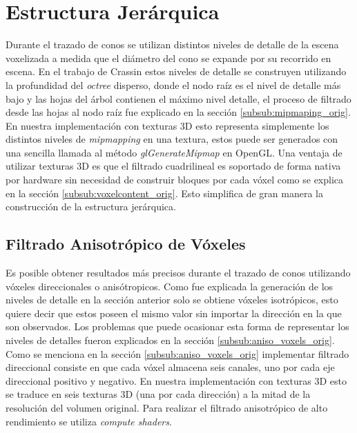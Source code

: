 \section{Estructura Jerárquica} %
\label{sec:estructura_jerarquica}
Durante el trazado de conos se utilizan distintos niveles de detalle de la escena voxelizada a medida que el diámetro del cono se expande por su recorrido en escena. En el trabajo de Crassin estos niveles de detalle se construyen utilizando la profundidad del \emph{octree} disperso, donde el nodo raíz es el nivel de detalle más bajo y las hojas del árbol contienen el máximo nivel detalle, el proceso de filtrado desde las hojas al nodo raíz fue explicado en la sección \ref{subsub:mipmaping_orig}. En nuestra implementación con texturas 3D esto representa simplemente los distintos niveles de \emph{mipmapping} en una textura, estos puede ser generados con una sencilla llamada al método \emph{glGenerateMipmap} en OpenGL. Una ventaja de utilizar texturas 3D es que el filtrado cuadrilineal es soportado de forma nativa por hardware sin necesidad de construir bloques por cada vóxel como se explica en la sección \ref{subsub:voxelcontent_orig}. Esto simplifica de gran manera la construcción de la estructura jerárquica.

\subsection{Filtrado Anisotrópico de Vóxeles} %
\label{sub:mipmapping_direccioanl}
Es posible obtener resultados más precisos durante el trazado de conos utilizando vóxeles direccionales o anisótropicos. Como fue explicada la generación de los niveles de detalle en la sección anterior solo se obtiene vóxeles isotrópicos, esto quiere decir que estos poseen el mismo valor sin importar la dirección en la que son observados. Los problemas que puede ocasionar esta forma de representar los niveles de detalles fueron explicados en la sección \ref{subsub:aniso_voxels_orig}.
Como se menciona en la sección \ref{subsub:aniso_voxels_orig} implementar filtrado direccional consiste en que cada vóxel almacena seis canales, uno por cada eje direccional positivo y negativo. En nuestra implementación con texturas 3D esto se traduce en seis texturas 3D (una por cada dirección) a la mitad de la resolución del volumen original. Para realizar el filtrado anisotrópico de alto rendimiento se utiliza \emph{compute shaders}.
